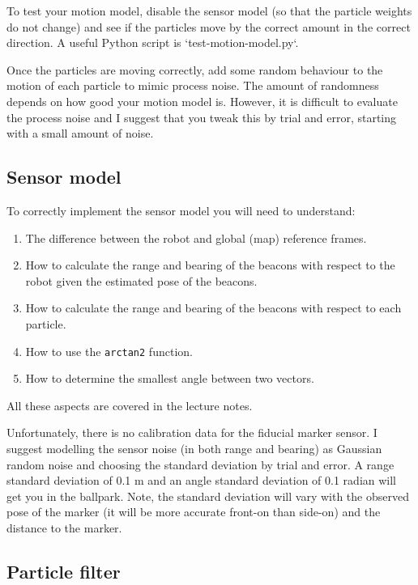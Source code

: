\documentclass[a4paper, 12pt]{article}
\newcommand{\code}[1]{\texttt{#1}}
\begin{document}
To test your motion model, disable the sensor model (so that the
particle weights do not change) and see if the particles move by the
correct amount in the correct direction.  A useful Python script is
`test-motion-model.py`.

Once the particles are moving correctly, add some random behaviour to
the motion of each particle to mimic process noise.  The amount of
randomness depends on how good your motion model is.  However, it is
difficult to evaluate the process noise and I suggest that you tweak
this by trial and error, starting with a small amount of noise.


\subsection{Sensor model}


To correctly implement the sensor model you will need to understand:
%
\begin{enumerate}
\item The difference between the robot and global (map) reference frames.

\item How to calculate the range and bearing of the beacons with
  respect to the robot given the estimated pose of the beacons.

\item How to calculate the range and bearing of the beacons with
  respect to each particle.

\item How to use the \code{arctan2} function.

\item How to determine the smallest angle between two vectors.
\end{enumerate}
%
All these aspects are covered in the lecture notes.

Unfortunately, there is no calibration data for the fiducial marker
sensor.  I suggest modelling the sensor noise (in both range and
bearing) as Gaussian random noise and choosing the standard deviation
by trial and error.  A range standard deviation of 0.1 m and an angle
standard deviation of 0.1 radian will get you in the ballpark.  Note,
the standard deviation will vary with the observed pose of the marker
(it will be more accurate front-on than side-on) and the distance to
the marker.

\subsection{Particle filter}
\end{document}
